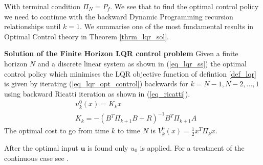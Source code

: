 With terminal condition $\Pi_N = P_f$. We see that to find the optimal control policy we need to continue with the backward Dynamic Programming recursion relationships until $k = 1$. We summarise one of the most fundamental results in Optimal Control theory in Theorem \ref{thrm_lqr_sol}.
\begin{thrm}
\textbf{Solution of the Finite Horizon LQR control problem} Given a finite horizon $N$ and a discrete linear system as shown in (\ref{eq_lqr_ss}) the optimal control policy which minimises the LQR objective function of defintion \ref{def_lqr} is given by iterating (\ref{eq_lqr_opt_control}) backwards for $k=N-1, N-2, ..., 1$ using backward Ricatti iteration as shown in (\ref{eq_ricatti}). 
\begin{equation}
\begin{aligned}
&u^0_{k}(x) = K_{k}x \\
&K_k = -(B^T\Pi_{k+1}B+R)^{-1}B^T\Pi_{k+1}A
\end{aligned}
\label{eq_lqr_opt_control}
\end{equation}
The optimal cost to go from time $k$ to time $N$ is $V^0_{k}(x)=\frac{1}{2}x^T\Pi_{k}x$.
\label{thrm_lqr_sol}
\end{thrm}
After the optimal input $\mathbf{u}$ is found only $u_0$ is applied. For a treatment of the continuous case see \cite{robust}.

